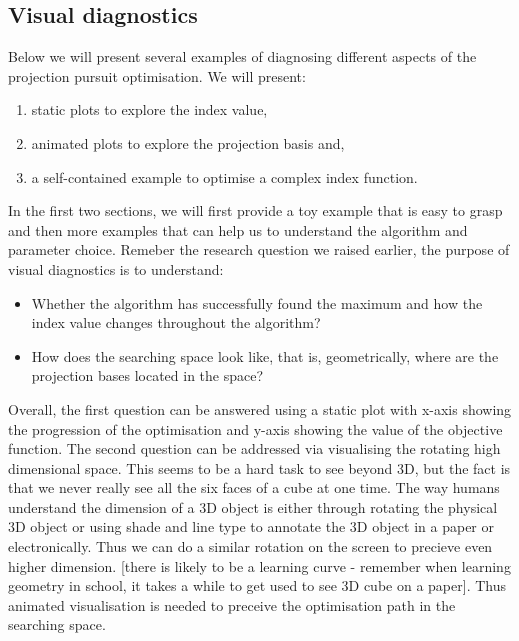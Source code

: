 \documentclass[12pt]{article}
\begin{document}
\hypertarget{visual-diagnostics}{%
\subsection{Visual diagnostics}\label{visual-diagnostics}}

Below we will present several examples of diagnosing different aspects
of the projection pursuit optimisation. We will present:

\begin{enumerate}
\def\labelenumi{\arabic{enumi})}
\item
  static plots to explore the index value,
\item
  animated plots to explore the projection basis and,
\item
  a self-contained example to optimise a complex index function.
\end{enumerate}

In the first two sections, we will first provide a toy example that is
easy to grasp and then more examples that can help us to understand the
algorithm and parameter choice. Remeber the research question we raised
earlier, the purpose of visual diagnostics is to understand:

\begin{itemize}
\item
  Whether the algorithm has successfully found the maximum and how the
  index value changes throughout the algorithm?
\item
  How does the searching space look like, that is, geometrically, where
  are the projection bases located in the space?
\end{itemize}

Overall, the first question can be answered using a static plot with
x-axis showing the progression of the optimisation and y-axis showing
the value of the objective function. The second question can be
addressed via visualising the rotating high dimensional space. This
seems to be a hard task to see beyond 3D, but the fact is that we never
really see all the six faces of a cube at one time. The way humans
understand the dimension of a 3D object is either through rotating the
physical 3D object or using shade and line type to annotate the 3D
object in a paper or electronically. Thus we can do a similar rotation
on the screen to precieve even higher dimension. {[}there is likely to
be a learning curve - remember when learning geometry in school, it
takes a while to get used to see 3D cube on a paper{]}. Thus animated
visualisation is needed to preceive the optimisation path in the
searching space.
\end{document}
